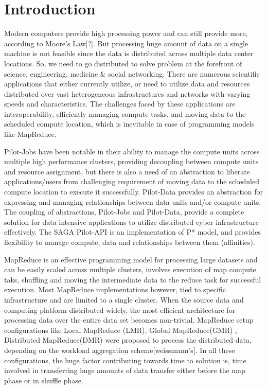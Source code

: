 \documentclass{acm_proc_article-sp}
\begin{document}

\section{Introduction}
Modern computers provide high processing power and can still provide more, according to Moore's Law[?]. But processing huge amount of data on a single machine is not feasible since the data is distributed across multiple data center locations. So, we need to go distributed to solve problem at the forefront of science, engineering, medicine \& social networking. There are numerous scientific applications that either currently utilize, or need to utilize data and resources distributed over vast heterogeneous infrastructures and networks with varying speeds and characteristics. The challenges faced by these applications are interoperability, efficiently managing compute tasks, and moving data to the scheduled compute location, which is inevitable in case of programming models like MapReduce.

Pilot-Jobs have been notable in their ability to manage the compute units across multiple high performance clusters, providing decoupling between compute units and resource assignment, but there is also a need of an abstraction to liberate applications/users from challenging requirement of moving data to the scheduled compute  location to execute it successfully. Pilot-Data provides an abstraction for expressing and managing relationships between data units and/or compute units. The coupling of abstractions, Pilot-Jobs and Pilot-Data, provide a complete solution for data intensive applications to utilize distributed cyber infrastructure effectively. The SAGA Pilot-API is an implementation of P* model, and provides flexibility to manage compute, data and relationships between them (affinities).

MapReduce is an effective programming model for processing large datasets and can be easily scaled across multiple clusters,  involves execution of map compute taks, shuffling and moving the intermediate data to the reduce task for successful execution. Most MapReduce implementations however, tied to specific infrastructure and are limited to a single cluster. When the source data and computing platform distributed widely, the most efficient architecture for processing data over the entire data set becomes non-trivial. MapReduce setup configurations like Local MapReduce (LMR), Global MapReduce(GMR) , Distributed MapReduce(DMR) were proposed to process the distributed data, depending on the workload aggregation scheme[weissmann's]. In all these configurations, the huge factor contributing towards time to solution is, time involved in transferring huge amounts of data transfer either before the map phase or in shuffle phase. 
\end{document}
